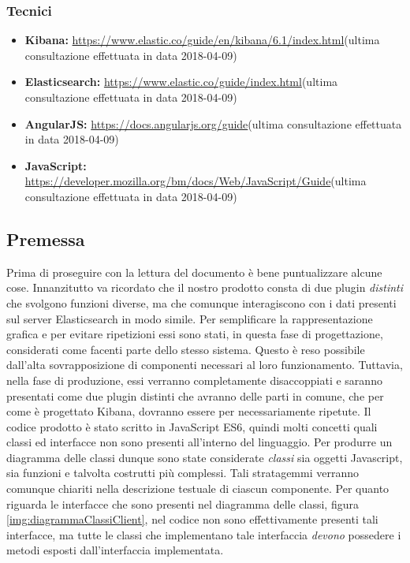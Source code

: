 \subsubsection{Tecnici}
\begin{itemize}
	\item \textbf{Kibana:} \href{https://www.elastic.co/guide/en/kibana/6.1/index.html}{https://www.elastic.co/guide/en/kibana/6.1/index.html}(ultima consultazione effettuata in data 2018-04-09)
	\item \textbf{Elasticsearch:} \href{https://www.elastic.co/guide/index.html}{https://www.elastic.co/guide/index.html}(ultima consultazione effettuata in data 2018-04-09)
	\item \textbf{AngularJS:} \href{https://docs.angularjs.org/guide}{https://docs.angularjs.org/guide}(ultima consultazione effettuata in data 2018-04-09)
	\item \textbf{JavaScript:} \href{https://developer.mozilla.org/bm/docs/Web/JavaScript/Guide}{https://developer.mozilla.org/bm/docs/Web/JavaScript/Guide}(ultima consultazione effettuata in data 2018-04-09)
\end{itemize}

\subsection{Premessa}
\label{sec:premessa}
Prima di proseguire con la lettura del documento è bene puntualizzare alcune cose.
Innanzitutto va ricordato che il nostro prodotto consta di due plugin \emph{distinti} che svolgono funzioni diverse, ma che comunque interagiscono con i dati presenti sul server Elasticsearch in modo simile. Per semplificare la rappresentazione grafica e per evitare ripetizioni essi sono stati, in questa fase di progettazione, considerati come facenti parte dello stesso sistema. Questo è reso possibile dall'alta sovrapposizione di componenti necessari al loro funzionamento. Tuttavia, nella fase di produzione, essi verranno completamente disaccoppiati e saranno presentati come due plugin distinti che avranno delle parti in comune, che per come è progettato Kibana, dovranno essere per necessariamente ripetute. 
Il codice prodotto è stato scritto in JavaScript ES6, quindi molti concetti quali classi ed interfacce non sono presenti all'interno del linguaggio. Per produrre un diagramma delle classi dunque sono state considerate \emph{ classi } sia oggetti Javascript, sia funzioni e talvolta costrutti più complessi. Tali stratagemmi verranno comunque chiariti nella descrizione testuale di ciascun componente. Per quanto riguarda le interfacce che sono presenti nel diagramma delle classi, figura \ref{img:diagrammaClassiClient}, nel codice non sono effettivamente presenti tali interfacce, ma tutte le classi che implementano tale interfaccia \emph{devono} possedere i metodi esposti dall'interfaccia implementata. 